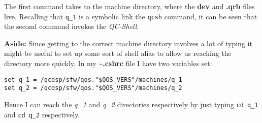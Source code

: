 The first command takes to the machine directory, where the {\bf dev}
and {\bf .qrb} files live. Recalling that {\tt q\_1} is a symbolic link
the {\tt qcsh} command, it can be seen that the second command invokes
the {\em QC-Shell}.

{\bf Aside: }
Since getting to the correct machine directory involves a lot of typing
it might be useful to set up some sort of shell alias to allow us
reaching the directory more quickly. In my {\bf \~\/.cshrc} file I have 
two variables set:
\begin{verbatim}
set q_1 = /qcdsp/sfw/qos."$QOS_VERS"/machines/q_1
set q_2 = /qcdsp/sfw/qos."$QOS_VERS"/machines/q_2 
\end{verbatim}
Hence I can reach the {\em q\_1} and {\em q\_2} directories respectively
by just typing {\tt cd q\_1} and {\tt cd q\_2} respectively.

